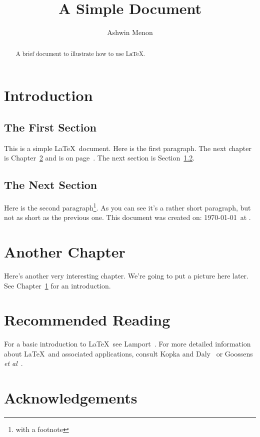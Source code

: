 \documentclass[12pt, bibliography=totoc]{scrreprt}
\title{A Simple Document}
\author{Ashwin Menon}
\begin{document}
\maketitle

\tableofcontents

\begin{abstract}
A brief document to illustrate how to use \LaTeX.    
\end{abstract}

\chapter{Introduction}
\label{ch:intro}

\section{The First Section}
This is a simple \LaTeX\ document. Here is the first paragraph.
The next chapter is Chapter~\ref{ch:another}
and is on page~\pageref{ch:another}.
The next section is Section~\ref{sec:next}.

\section{The Next Section}
\label{sec:next}

Here is the second paragraph\footnote{with a footnote}. As you
can see it's a rather short paragraph, but not as short as the
previous one. This document was created on: \today\ at \currenttime.

\chapter{Another Chapter}
\label{ch:another}

Here's another very interesting chapter.
We're going to put a picture here later.
See Chapter~\ref{ch:intro} for an introduction.

\chapter{Recommended Reading}
For a basic introduction to \LaTeX\ see Lamport~\cite{lamport94}. For more
detailed information about \LaTeX\ and associated applications, consult
Kopka and Daly~\cite{kopka95} or Goossens \emph{et al}~\cite{goossens94}.

\chapter*{Acknowledgements}
\end{document}
